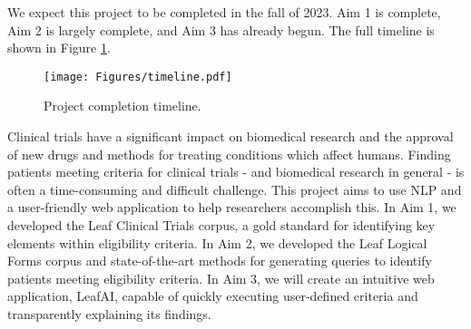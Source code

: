 \documentclass[../main.tex]{subfiles}
\begin{document}
We expect this project to be completed in the fall of 2023. Aim 1 is complete, Aim 2 is largely complete, and Aim 3 has already begun. The full timeline is shown in Figure \ref{timeline}.

\begin{figure}[h!]
  \texttt{[image: Figures/timeline.pdf]} 
\caption{Project completion timeline.}
\label{timeline}
\end{figure}

Clinical trials have a significant impact on biomedical research and the approval of new drugs and methods for treating conditions which affect humans. Finding patients meeting criteria for clinical trials - and biomedical research in general - is often a time-consuming and difficult challenge. This project aims to use NLP and a user-friendly web application to help researchers accomplish this. In Aim 1, we developed the Leaf Clinical Trials corpus, a gold standard for identifying key elements within eligibility criteria. In Aim 2, we developed the Leaf Logical Forms corpus and state-of-the-art methods for generating queries to identify patients meeting eligibility criteria. In Aim 3, we will create an intuitive web application, LeafAI, capable of quickly executing user-defined criteria and transparently explaining its findings.
\end{document}
